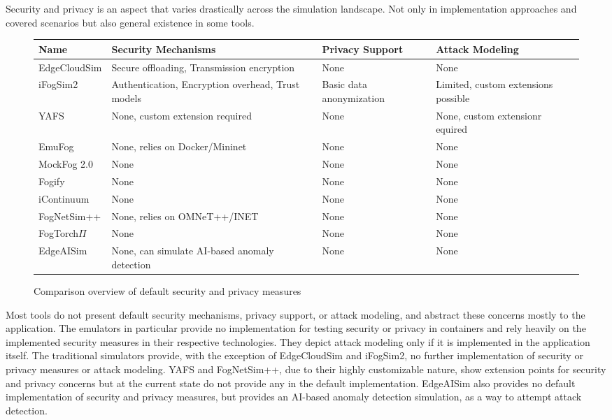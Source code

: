 
Security and privacy is an aspect that varies drastically across the simulation landscape. 
Not only in implementation approaches and covered scenarios but also general existence in some tools.
\begin{figure}[H]
  \centering
  \begin{tabularx}{\textwidth}{ l | X | X | X }
    \hline
    \textbf{Name} & \textbf{Security Mechanisms} & \textbf{Privacy Support} & \textbf{Attack Modeling}\\
    \hline\hline
    EdgeCloudSim  & Secure offloading, Transmission encryption & None & None \\\hline
    iFogSim2      & Authentication, Encryption overhead, Trust models & Basic data anonymization & Limited, custom extensions possible \\\hline
    YAFS          & None, custom extension required & None & None, custom extensionr equired  \\\hline
    EmuFog        & None, relies on Docker/Mininet & None & None \\\hline
    MockFog 2.0   & None & None & None \\\hline
    Fogify        & None & None & None \\\hline
    iContinuum    & None & None & None \\\hline
    FogNetSim++   & None, relies on OMNeT++/INET & None & None \\\hline
    FogTorch$\Pi$ & None & None & None \\\hline
    EdgeAISim     & None, can simulate AI-based anomaly detection & None & None  \\\hline
  \end{tabularx}
  \caption{Comparison overview of default security and privacy measures}
  \label{tab:analysis-security-n-privacy}
\end{figure}

Most tools do not present default security mechanisms, privacy support, or attack modeling, and abstract these concerns mostly to the application.
The emulators in particular provide no implementation for testing security or privacy in containers and rely heavily on the implemented security measures in their respective technologies. 
They depict attack modeling only if it is implemented in the application itself.
The traditional simulators provide, with the exception of EdgeCloudSim and iFogSim2, no further implementation of security or privacy measures or attack modeling.
YAFS and FogNetSim++, due to their highly customizable nature, show extension points for security and privacy concerns but at the current state do not provide any in the default implementation.
EdgeAISim also provides no default implementation of security and privacy measures, but provides an AI-based anomaly detection simulation, as a way to attempt attack detection.

